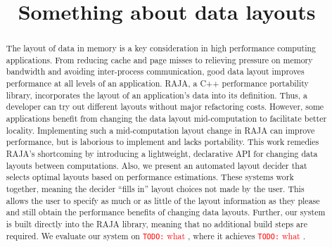 \documentclass[sigconf, table]{acmart}
\title{Something about data layouts}
\newcommand{\todo}[1]{{\textcolor{red}{{\tt{TODO:}}\,\,#1 }}}
\begin{document}
\begin{abstract}



The layout of data in memory is a key consideration in high performance computing applications.
From reducing cache and page misses to relieving pressure on memory bandwidth and avoiding inter-process communication, good data layout improves performance at all levels of an application.
RAJA, a C++ performance portability library, incorporates the layout of an application's data into its definition.
Thus, a developer can try out different layouts without major refactoring costs.
However, some applications benefit from changing the data layout mid-computation to facilitate better locality.
Implementing such a mid-computation layout change in RAJA can improve performance, but is laborious to implement and lacks portability.
This work remedies RAJA's shortcoming by introducing a lightweight, declarative API for changing data layouts between computations.
Also, we present an automated layout decider that selects optimal layouts based on performance estimations. 
These systems work together, meaning the decider \enquote{fills in} layout choices not made by the user.
This allows the user to specify as much or as little of the layout information as they please and still obtain the performance benefits of changing data layouts.  
Further, our system is built directly into the RAJA library, meaning that no additional build steps are required.
We evaluate our system on \todo{what}, where it achieves \todo{what}.
\end{abstract}
\end{document}
